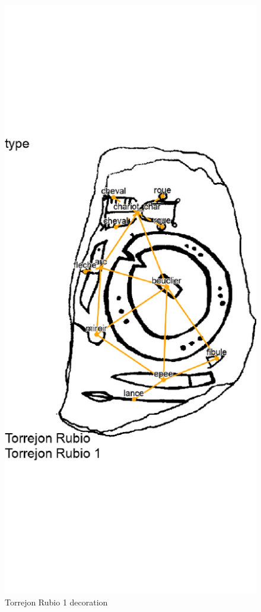 \documentclass[article]{jss}\usepackage{knitr}
\begin{document}
\begin{figure}[H]
{\centering \includegraphics[width=\maxwidth]{figure/unnamed-chunk-10-1} 

}

\caption{\label{fig:figs}Torrejon Rubio 1 decoration}\label{fig:unnamed-chunk-10}
\end{figure}
\end{document}
